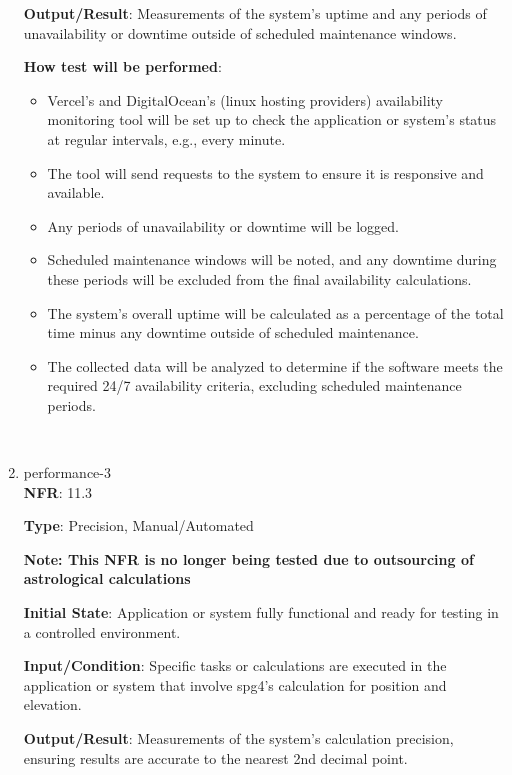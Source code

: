 \documentclass[12pt, titlepage]{article}
\begin{document}
\begin{enumerate}
\textbf{Output/Result}: Measurements of the system's uptime and any periods of unavailability or downtime outside of scheduled maintenance windows.

\textbf{How test will be performed}: 
\begin{itemize}
    \item Vercel's and DigitalOcean's (linux hosting providers) availability monitoring tool will be set up to check the application or system's status at regular intervals, e.g., every minute.
    \item The tool will send requests to the system to ensure it is responsive and available.
    \item Any periods of unavailability or downtime will be logged.
    \item Scheduled maintenance windows will be noted, and any downtime during these periods will be excluded from the final availability calculations.
    \item The system's overall uptime will be calculated as a percentage of the total time minus any downtime outside of scheduled maintenance.
    \item The collected data will be analyzed to determine if the software meets the required 24/7 availability criteria, excluding scheduled maintenance periods.
\end{itemize}\\

\item{performance-3 \\}
\textbf{NFR}: 11.3

\textbf{Type}: Precision, Manual/Automated

\textbf{Note: This NFR is no longer being tested due to outsourcing of astrological calculations    }

\textbf{Initial State}: Application or system fully functional and ready for testing in a controlled environment.

\textbf{Input/Condition}: Specific tasks or calculations are executed in the application or system that involve spg4's calculation for position and elevation.

\textbf{Output/Result}: Measurements of the system's calculation precision, ensuring results are accurate to the nearest 2nd decimal point.


\end{enumerate}
\end{document}
